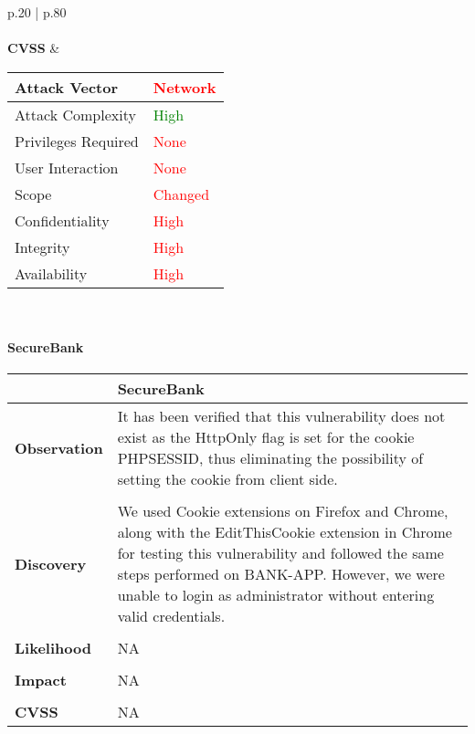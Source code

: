 \begin{longtable*}{p{.20\textwidth} | p{.80\textwidth}}
    \\\\
    \textbf{CVSS} &
      \begin{tabular}{| l | l |}
      \hline
      Attack Vector		& \textcolor{red}{Network}\\
      \hline
      Attack Complexity	& \textcolor{Green}{High} \\
      \hline
      Privileges Required & \textcolor{red}{None} \\
      \hline
      User Interaction	& \textcolor{red}{None} \\
      \hline
      Scope		& \textcolor{red}{Changed} \\
      \hline
      Confidentiality	& \textcolor{red}{High} \\
      \hline
      Integrity		& \textcolor{red}{High} \\
      \hline
      Availability		& \textcolor{red}{High} \\
      \hline
      \end{tabular}
    \\
    \hline
\end{longtable*}
\paragraph{SecureBank} \mbox{}
\begin{longtable*}{p{.20\textwidth} | p{.80\textwidth}}
    \hline
    & \textbf{SecureBank} \\
    \hline
    \textbf{Observation} &
       It has been verified that this vulnerability does not exist as the HttpOnly flag is set for the cookie PHPSESSID, thus eliminating the possibility of setting the cookie from client side.
    \\\\
    \textbf{Discovery} &
    We used Cookie extensions on Firefox and Chrome, along with the EditThisCookie extension in Chrome for testing this vulnerability and followed the same steps performed on BANK-APP. However, we were unable to login as administrator without entering valid credentials.
    \\\\
    \textbf{Likelihood} &
        NA
    \\\\
    \textbf{Impact} &
        NA
    \\\\
    \textbf{CVSS} &
        NA
    \\
    \hline
\end{longtable*}
\clearpage